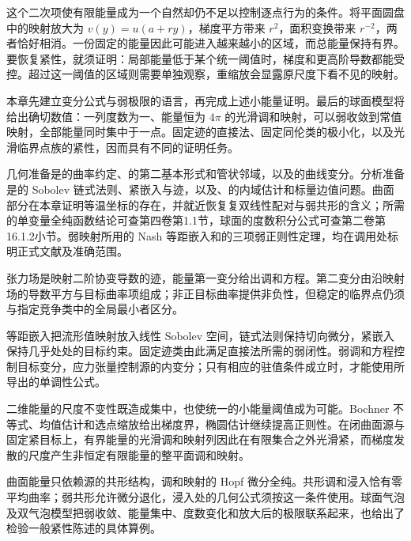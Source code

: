 \ProseParagraphBreak

这个二次项使有限能量成为一个自然却仍不足以控制逐点行为的条件。将平面圆盘中的映射放大为 \(v(y)=u(a+ry)\)，梯度平方带来 \(r^2\)，面积变换带来 \(r^{-2}\)，两者恰好相消。一份固定的能量因此可能进入越来越小的区域，而总能量保持有界。要恢复紧性，就须证明：局部能量低于某个统一阈值时，梯度和更高阶导数都能受控。超过这一阈值的区域则需要单独观察，重缩放会显露原尺度下看不见的映射。

\ProseParagraphBreak

本章先建立变分公式与弱极限的语言，再完成上述小能量证明。最后的球面模型将给出确切数值：一列度数为一、能量恒为 \(4\pi\) 的光滑调和映射，可以弱收敛到常值映射，全部能量同时集中于一点。固定迹的直接法、固定同伦类的极小化，以及光滑临界点族的紧性，因而具有不同的证明任务。

\ProseParagraphBreak

几何准备是的曲率约定、的第二基本形式和管状邻域，以及的曲线变分。分析准备是的 Sobolev 链式法则、紧嵌入与迹，以及、的内域估计和标量边值问题。曲面部分在本章证明等温坐标的存在，并就近恢复复双线性配对与弱共形的含义；所需的单变量全纯函数结论可查第四卷第1.1节，球面的度数积分公式可查第二卷第16.1.2小节。弱映射所用的 Nash 等距嵌入和的三项弱正则性定理，均在调用处标明正式文献及准确范围。






\begin{chaptersummary}
	张力场是映射二阶协变导数的迹，能量第一变分给出调和方程。第二变分由沿映射场的导数平方与目标曲率项组成；非正目标曲率提供非负性，但稳定的临界点仍须与指定竞争类中的全局最小者区分。

	\ProseParagraphBreak

	等距嵌入把流形值映射放入线性 Sobolev 空间，链式法则保持切向微分，紧嵌入保持几乎处处的目标约束。固定迹类由此满足直接法所需的弱闭性。弱调和方程控制目标变分，应力张量控制源的内变分；只有相应的驻值条件成立时，才能使用所导出的单调性公式。

	\ProseParagraphBreak

	二维能量的尺度不变性既造成集中，也使统一的小能量阈值成为可能。Bochner 不等式、均值估计和选点缩放给出梯度界，椭圆估计继续提高正则性。在闭曲面源与固定紧目标上，有界能量的光滑调和映射列因此在有限集合之外光滑紧，而梯度发散的尺度产生非恒定有限能量的整平面调和映射。

	\ProseParagraphBreak

	曲面能量只依赖源的共形结构，调和映射的 Hopf 微分全纯。共形调和浸入恰有零平均曲率；弱共形允许微分退化，浸入处的几何公式须按这一条件使用。球面气泡及双气泡模型把弱收敛、能量集中、度数变化和放大后的极限联系起来，也给出了检验一般紧性陈述的具体算例。
\end{chaptersummary}

